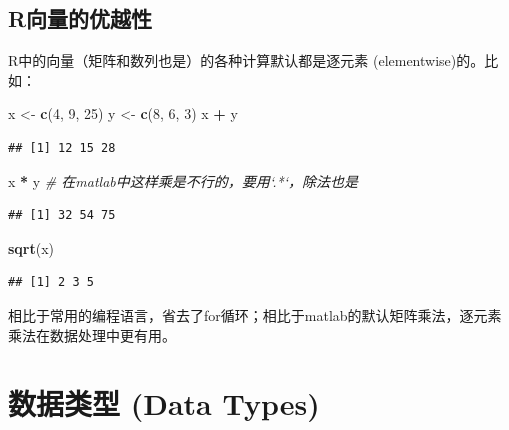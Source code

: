 \documentclass[]{book}
\newenvironment{Shaded}{\begin{snugshade}}{\end{snugshade}}
\newcommand{\CommentTok}[1]{\textcolor[rgb]{0.56,0.35,0.01}{\textit{#1}}}
\newcommand{\DecValTok}[1]{\textcolor[rgb]{0.00,0.00,0.81}{#1}}
\newcommand{\KeywordTok}[1]{\textcolor[rgb]{0.13,0.29,0.53}{\textbf{#1}}}
\newcommand{\NormalTok}[1]{#1}
\newcommand{\OperatorTok}[1]{\textcolor[rgb]{0.81,0.36,0.00}{\textbf{#1}}}
\newcommand{\StringTok}[1]{\textcolor[rgb]{0.31,0.60,0.02}{#1}}
\begin{document}
\hypertarget{youyuexing}{%
\subsection{R向量的优越性}\label{youyuexing}}

R中的向量（矩阵和数列也是）的各种计算默认都是逐元素 (elementwise)的。比如：

\begin{Shaded}
\begin{Highlighting}[]
\NormalTok{x <-}\StringTok{ }\KeywordTok{c}\NormalTok{(}\DecValTok{4}\NormalTok{, }\DecValTok{9}\NormalTok{, }\DecValTok{25}\NormalTok{)}
\NormalTok{y <-}\StringTok{ }\KeywordTok{c}\NormalTok{(}\DecValTok{8}\NormalTok{, }\DecValTok{6}\NormalTok{, }\DecValTok{3}\NormalTok{)}
\NormalTok{x }\OperatorTok{+}\StringTok{ }\NormalTok{y}
\end{Highlighting}
\end{Shaded}

\begin{verbatim}
## [1] 12 15 28
\end{verbatim}

\begin{Shaded}
\begin{Highlighting}[]
\NormalTok{x }\OperatorTok{*}\StringTok{ }\NormalTok{y }\CommentTok{# 在matlab中这样乘是不行的，要用`.*`，除法也是}
\end{Highlighting}
\end{Shaded}

\begin{verbatim}
## [1] 32 54 75
\end{verbatim}

\begin{Shaded}
\begin{Highlighting}[]
\KeywordTok{sqrt}\NormalTok{(x)}
\end{Highlighting}
\end{Shaded}

\begin{verbatim}
## [1] 2 3 5
\end{verbatim}

相比于常用的编程语言，省去了for循环；相比于matlab的默认矩阵乘法，逐元素乘法在数据处理中更有用。

\hypertarget{-data-types}{%
\section{数据类型 (Data Types)}\label{-data-types}}
\end{document}
